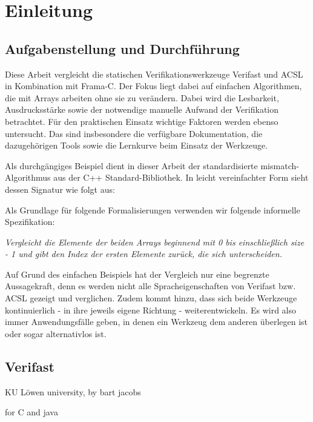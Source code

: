 ﻿\chapter{Einleitung}

\section{Aufgabenstellung und Durchführung}
\label{sec:aufgabenstellung}
Diese Arbeit vergleicht die statischen Verifikationswerkzeuge Verifast und ACSL in Kombination mit Frama-C. 
Der Fokus liegt dabei auf einfachen Algorithmen, die mit Arrays arbeiten ohne sie zu verändern.
Dabei wird die Lesbarkeit, Ausdrucksstärke sowie der notwendige manuelle Aufwand der Verifikation betrachtet.
Für den praktischen Einsatz wichtige Faktoren werden ebenso untersucht. Das sind insbesondere die verfügbare 
Dokumentation, die dazugehörigen Tools sowie die Lernkurve beim Einsatz der Werkzeuge.

Als durchgängiges Beispiel dient in dieser Arbeit der standardisierte mismatch-Algorithmus aus
der C++ Standard-Bibliothek. In leicht vereinfachter Form sieht dessen Signatur wie folgt aus:




Als Grundlage für folgende Formalisierungen verwenden wir folgende informelle Spezifikation:

\emph{Vergleicht die Elemente der beiden Arrays beginnend mit 0 bis einschließlich size - 1 und gibt den
Index der ersten Elemente zurück, die sich unterscheiden.}

Auf Grund des einfachen Beispiels hat der Vergleich nur eine begrenzte Aussagekraft, denn es werden nicht alle
Spracheigenschaften von Verifast bzw. ACSL gezeigt und verglichen. Zudem kommt hinzu, dass sich beide Werkzeuge
kontinuierlich - in ihre jeweils eigene Richtung - weiterentwickeln. Es wird also immer Anwendungsfälle geben,
in denen ein Werkzeug dem anderen überlegen ist oder sogar alternativlos ist.



\section{Verifast}
\label{sec:verifast}

KU Löwen university, by bart jacobs


for C and java



